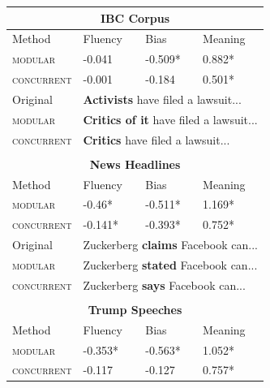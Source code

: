 \begin{table}[]
\begin{tabular}{llll}
\multicolumn{4}{c}{\textbf{IBC Corpus}}                          \\ \hline \hline
\multicolumn{1}{l|}{Method}           & Fluency & Bias  & Meaning\\ \hline
\multicolumn{1}{l|}{\textsc{modular}}  &  -0.041      &  -0.509*    &  0.882*       \\
\multicolumn{1}{l|}{\textsc{concurrent}} &  -0.001      &  -0.184      &  0.501*      \\ \hline \hline
\multicolumn{1}{l|}{Original} & \multicolumn{3}{l}{\small \textbf{Activists} have filed a lawsuit...} \\
\multicolumn{1}{l|}{\textsc{modular}} & \multicolumn{3}{l}{\small \textbf{Critics of it} have filed a lawsuit...} \\
\multicolumn{1}{l|}{\textsc{concurrent}} & \multicolumn{3}{l}{\small \textbf{Critics} have filed a lawsuit...}
\\  \\
\multicolumn{4}{c}{\textbf{News Headlines}}                         \\ \hline \hline
\multicolumn{1}{l|}{Method}           & Fluency & Bias & Meaning \\ \hline
\multicolumn{1}{l|}{\textsc{modular}}  &   -0.46*      &  -0.511*     &   1.169*     \\
\multicolumn{1}{l|}{\textsc{concurrent}} &   -0.141*     &  -0.393*     &  0.752*       \\ \hline \hline
\multicolumn{1}{l|}{Original} & \multicolumn{3}{l}{\small Zuckerberg \textbf{claims} Facebook can...} \\
\multicolumn{1}{l|}{\textsc{modular}} & \multicolumn{3}{l}{\small Zuckerberg \textbf{stated} Facebook can...} \\
\multicolumn{1}{l|}{\textsc{concurrent}} & \multicolumn{3}{l}{\small Zuckerberg \textbf{says} Facebook can...} \\ \\
\multicolumn{4}{c}{\textbf{Trump Speeches}}                         \\ \hline \hline
\multicolumn{1}{l|}{Method}           & Fluency & Bias  & Meaning\\ \hline
\multicolumn{1}{l|}{\textsc{modular}}  &  -0.353*      &  -0.563*     &  1.052*        \\
\multicolumn{1}{l|}{\textsc{concurrent}} &  -0.117      &  -0.127    &  0.757*     \\\hline \hline

\end{tabular}
\end{table}
